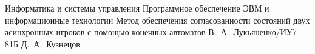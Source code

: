 \documentclass{bmstu}
\begin{document}
\makethesistitle
	{Информатика и системы управления}
	{Программное обеспечение ЭВМ и информационные технологии}
	{Метод обеспечения согласованности состояний двух асинхронных игроков с помощью конечных автоматов}
	{В.~А.~Лукьяненко/ИУ7-81Б}
	{Д.~А.~Кузнецов}
	{}{}

\setcounter{page}{5}


\maketableofcontents










\makebibliography


\end{document}
